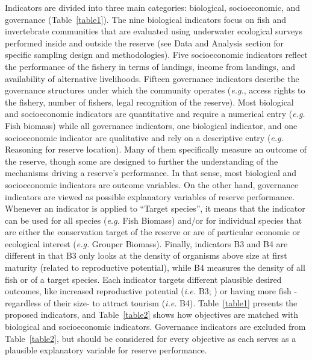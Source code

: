\documentclass[10pt,letterpaper]{article}
\begin{document}
Indicators are divided into three main categories: biological, socioeconomic, and governance (Table~\ref{table1}). The nine biological indicators focus on fish and invertebrate communities that are evaluated using underwater ecological surveys performed inside and outside the reserve (see Data and Analysis section for specific sampling design and methodologies). Five socioeconomic indicators reflect the performance of the fishery in terms of landings, income from landings, and availability of alternative livelihoods. Fifteen governance indicators describe the governance structures under which the community operates (\emph{e.g.}, access rights to the fishery, number of fishers, legal recognition of the reserve). Most biological and socioeconomic indicators are quantitative and require a numerical entry (\emph{e.g.} Fish biomass) while all governance indicators, one biological indicator, and one socioeconomic indicator are qualitative and rely on a descriptive entry (\emph{e.g.} Reasoning for reserve location). Many of them specifically measure an outcome of the reserve, though some are designed to further the understanding of the mechanisms driving a reserve's performance. In that sense, most biological and socioeconomic indicators are outcome variables. On the other hand, governance indicators are viewed as possible explanatory variables of reserve performance. Whenever an indicator is applied to ``Target species'', it means that the indicator can be used for all species (\emph{e.g.} Fish Biomass) and/or for individual species that are either the conservation target of the reserve or are of particular economic or ecological interest (\emph{e.g.} Grouper Biomass). Finally, indicators B3 and B4 are different in that B3 only looks at the density of organisms above size at first maturity (related to reproductive potential), while B4 measures the density of all fish or of a target species. Each indicator targets different plausible desired outcomes, like increased reproductive potential (\emph{i.e.} B3; \cite{carter_2017-Uf}) or having more fish -regardless of their size- to attract tourism (\emph{i.e.} B4). Table~\ref{table1} presents the proposed indicators, and Table~\ref{table2} shows how objectives are matched with biological and socioeconomic indicators. Governance indicators are excluded from Table~\ref{table2}, but should be considered for every objective as each serves as a plausible explanatory variable for reserve performance.
\end{document}
